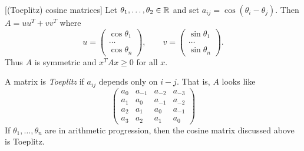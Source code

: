 \begin{examples}
    \item{} [(Toeplitz) cosine matrices]
    Let $\theta_1, \dots, \theta_2 \in \mathbb{R}$ and set
    $a_{ij} = \cos(\theta_i - \theta_j)$.
    Then $A = u u^T + v v^T$ where \[
        u = \begin{pmatrix}
            \cos \theta_1 \\
            \dots \\
            \cos \theta_n
        \end{pmatrix}, \qquad
        v = \begin{pmatrix}
            \sin \theta_1 \\
            \dots \\
            \sin \theta_n
        \end{pmatrix}.
    \] Thus $A$ is symmetric and $x^T A x \ge 0$ for all $x$.

    A matrix is \emph{Toeplitz} if $a_{ij}$ depends only on $i - j$.
    That is, $A$ looks like \[
        \begin{pmatrix}
            a_0 & a_{-1} & a_{-2} & a_{-3} \\
            a_1 & a_0 & a_{-1} & a_{-2} \\
            a_2 & a_1 & a_0 & a_{-1} \\
            a_3 & a_2 & a_1 & a_0
        \end{pmatrix}
    \] If $\theta_1, \dots, \theta_n$ are in arithmetic progression, then
    the cosine matrix discussed above is Toeplitz.


\end{examples}
